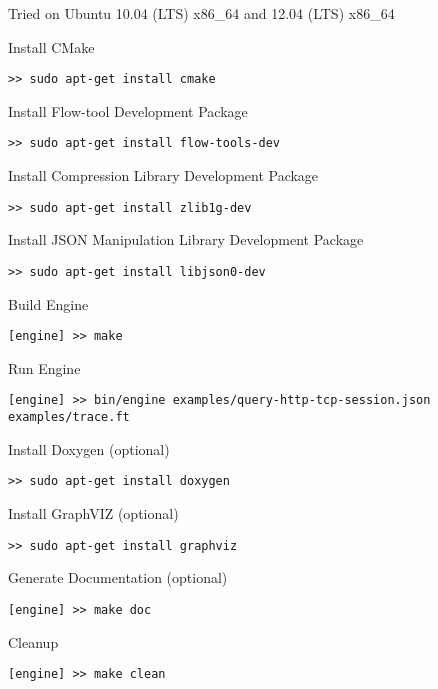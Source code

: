 Tried on Ubuntu 10.04 (LTS) x86\_64 and 12.04 (LTS) x86\_64

Install CMake

\begin{lstlisting}
>> sudo apt-get install cmake
\end{lstlisting}

Install Flow-tool Development Package

\begin{lstlisting}
>> sudo apt-get install flow-tools-dev  
\end{lstlisting}

Install Compression Library Development Package

\begin{lstlisting}
>> sudo apt-get install zlib1g-dev
\end{lstlisting}

Install JSON Manipulation Library Development Package

\begin{lstlisting}
>> sudo apt-get install libjson0-dev
\end{lstlisting}

Build Engine

\begin{lstlisting}
[engine] >> make
\end{lstlisting}

Run Engine

\begin{lstlisting}
[engine] >> bin/engine examples/query-http-tcp-session.json examples/trace.ft
\end{lstlisting}

Install Doxygen (optional)

\begin{lstlisting}
>> sudo apt-get install doxygen
\end{lstlisting}

Install GraphVIZ (optional)

\begin{lstlisting}
>> sudo apt-get install graphviz
\end{lstlisting}

Generate Documentation (optional)

\begin{lstlisting}
[engine] >> make doc
\end{lstlisting}

Cleanup

\begin{lstlisting}
[engine] >> make clean
\end{lstlisting}

